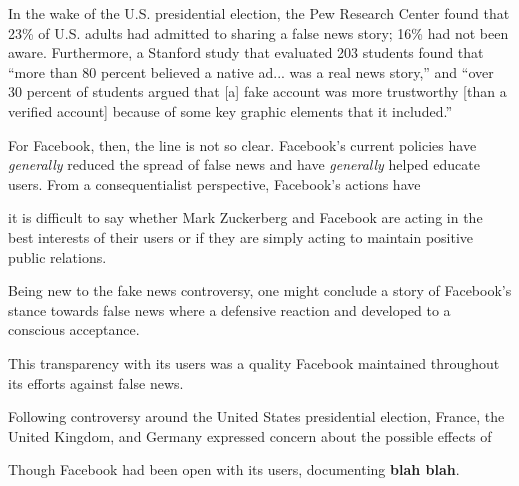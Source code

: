 \par In the wake of the U.S. presidential election, the Pew Research Center found that 23\% of U.S. adults had admitted to sharing a false news story; 16\% had not been aware. \cite{pew_confusion} Furthermore, a Stanford study that evaluated 203 students found that ``more than 80 percent believed a native ad... was a real news story,'' and ``over 30 percent of students argued that [a] fake account was more trustworthy [than a verified account] because of some key graphic elements that it included.'' \cite{stanford_credibility}

\cite{tc_responsibility}


\par For Facebook, then, the line is not so clear. Facebook's current policies have \emph{generally} reduced the spread of false news \cite{guardian_steps} and have \emph{generally} helped educate users. \cite{guardian_steps} From a consequentialist perspective, Facebook's actions have 

  it is difficult to say whether Mark Zuckerberg and Facebook are acting in the best interests of their users or if they are simply acting to maintain positive public relations.



\par Being new to the fake news controversy, one might conclude a story of Facebook's stance towards false news where a defensive reaction and developed to a conscious acceptance.






\par This transparency with its users was a quality Facebook maintained throughout its efforts against false news.

\par Following controversy around the United States presidential election, France, the United Kingdom, and Germany expressed concern about the possible effects of 


\par Though Facebook had been open with its users, documenting \textbf{blah blah}.

